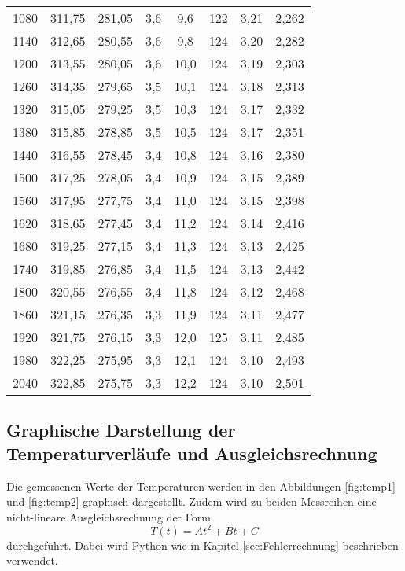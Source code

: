 \begin{table}
\begin{tabular}{c c c c c c c c}
    1080  &	 311,75  &  281,05	&	 3,6	&  9,6 	 &  122	 &  3,21	&   2,262 \\
    1140  &	 312,65  &  280,55	&	 3,6	&  9,8 	 &  124  &  3,20	&   2,282 \\
    1200  &	 313,55  &  280,05	&	 3,6	&  10,0  &	124  &  3,19	&   2,303  \\
    1260  &	 314,35  &  279,65	&	 3,5	&  10,1  &	124  &  3,18	&   2,313  \\
    1320	&  315,05  &  279,25	&	 3,5	&  10,3  &  124  &  3,17	&   2,332  \\
    1380	&  315,85  &  278,85	&	 3,5	&  10,5  &	124  &  3,17	&   2,351 \\
    1440	&  316,55  &	278,45	&	 3,4	&  10,8  &	124	 &  3,16	&   2,380  \\
    1500	&  317,25  & 	278,05	&	 3,4	&  10,9  &	124	 &  3,15	&   2,389 \\
    1560	&  317,95  &	277,75	&	 3,4	&  11,0  &	124  &  3,15	&   2,398  \\
    1620	&  318,65  & 	277,45	&	 3,4	&  11,2  &	124  &  3,14	&   2,416 \\
    1680	&  319,25  & 	277,15	&	 3,4	&  11,3  &	124  &  3,13	&   2,425 \\
    1740	&  319,85  & 	276,85	&  3,4	&  11,5  &	124  &  3,13	&   2,442 \\
    1800	&  320,55  & 	276,55	&  3,4	&  11,8  &	124  &  3,12	&   2,468 \\
    1860	&  321,15  &	276,35	&  3,3	&  11,9  &	124  &  3,11	&   2,477  \\
    1920	&  321,75  &	276,15  &	 3,3	&  12,0  &  125  &  3,11	&   2,485  \\
    1980	&  322,25  &  275,95  &	 3,3	&  12,1  &  124  &  3,10	&   2,493 \\
    2040	&  322,85  &  275,75  &	 3,3	&  12,2  &  124  &  3,10	&   2,501 \\
    \bottomrule
  \end{tabular}
\end{table}

\subsection{Graphische Darstellung der Temperaturverläufe und Ausgleichsrechnung}
Die gemessenen Werte der Temperaturen werden in den Abbildungen \ref{fig:temp1} und \ref{fig:temp2}
graphisch dargestellt. Zudem wird zu beiden Messreihen eine nicht-lineare
Ausgleichsrechnung der Form
\begin{equation}
  T(t)=At^2+Bt+C
\end{equation}
durchgeführt. Dabei wird Python wie in Kapitel \ref{sec:Fehlerrechnung} beschrieben
verwendet.

